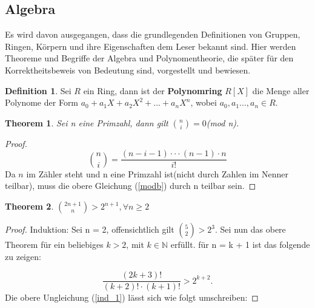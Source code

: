 \documentclass[12pt,oneside]{article}
\newtheorem{theorem}{Theorem}[section]
\theoremstyle{remark}
\theoremstyle{definition}
\newtheorem{definition}{Definition}[section]
\begin{document}
\subsection{Algebra}
Es wird davon ausgegangen, dass die grundlegenden Definitionen von Gruppen, Ringen, Körpern und ihre Eigenschaften dem Leser bekannt sind. Hier werden Theoreme und Begriffe der Algebra und Polynomentheorie, die später für den Korrektheitsbeweis von Bedeutung sind, vorgestellt und bewiesen.
\begin{flushleft}

\smallskip

\begin{definition}
Sei $R$ ein Ring, dann ist der \textbf{Polynomring} $R[X]$ die Menge aller Polynome der Form $a_{0} + a_{1}X + a_{2} X^2 + ... + a_{n}X^n$, wobei $a_{0},a_{1}...,a_{n} \in R$.
\end{definition}

\smallskip 

\begin{theorem}\label{th_25}
Sei n eine Primzahl, dann gilt ${n \choose i} = 0 $(mod n).
\end{theorem}

\begin{proof}
\begin{equation}\label{modb}
    {n \choose i} = \frac{(n - i - 1) \cdot \cdot \cdot (n - 1) \cdot n }{i!}
\end{equation}
Da $n$ im Zähler steht und n eine Primzahl ist(nicht durch Zahlen im Nenner teilbar), muss die obere Gleichung (\ref{modb}) durch n teilbar sein. 
\end{proof}

\smallskip
\begin{flushleft}
\begin{theorem}
${2n + 1 \choose n} > 2^{n+1}, \forall n \geq 2$
\end{theorem}

\begin{proof}
Induktion: Sei n = 2, offensichtlich gilt ${5 \choose 2} > 2^3$. Sei nun das obere Theorem für ein beliebiges $k > 2 $, mit $ k \in \mathbb{N}$ erfüllt.\newline\newline
für n = k + 1 ist das folgende zu zeigen: 

\begin{equation}\label{ind_1}
    \frac{(2k + 3)!}{(k + 2)!\cdot(k + 1)!} > 2^{k+2}.
\end{equation}
\newline\newline
Die obere Ungleichung (\ref{ind_1}) lässt sich wie folgt umschreiben:\newline\newline



\end{proof}
\end{flushleft}
\end{flushleft}
\end{document}

